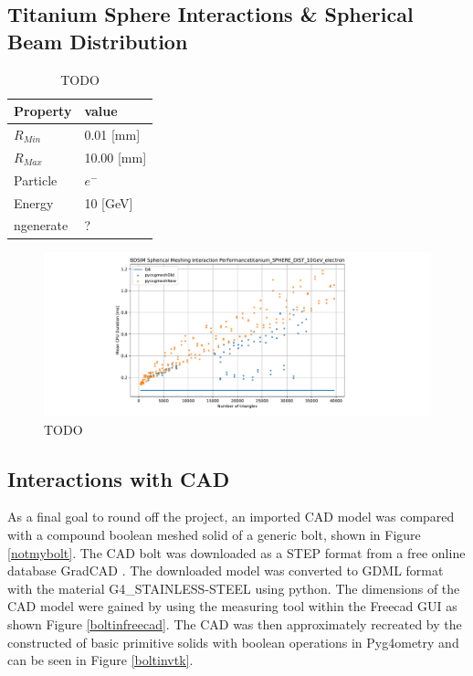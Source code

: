 \documentclass[12pt,a4paper]{article}
\begin{document}
\newpage
\subsection{Titanium Sphere Interactions \& Spherical Beam Distribution}

\begin{table}[h!]
\centering
\begin{tabular}{|l|l|}
\hline
Property & value \\ \hline
$R_{Min}$ &  0.01 [mm]\\ \hline
$R_{Max}$ &  10.00 [mm]\\ \hline
Particle &  $e^-$\\ \hline
Energy & 10 [GeV]\\ \hline
ngenerate & ?\\ \hline
\end{tabular}
\caption{TODO}
\label{rs}
\end{table}

\begin{figure}[h!]
\centering
\includegraphics[scale=0.5]{Images//BDSIM//numoftris_tit_10G_e_nostd.pdf}
\caption[width=\columnwidth]{TODO}
\label{tubspic}
\end{figure}

\subsection{Interactions with CAD}
As a final goal to round off the project, an imported CAD model was compared with a compound boolean meshed solid of a generic bolt, shown in Figure \ref{notmybolt}. The CAD bolt was downloaded as a STEP format from a free online database GradCAD \cite{cadmag}. The downloaded model was converted to GDML format with the material G4\_STAINLESS-STEEL using python. The dimensions of the CAD model were gained by using the measuring tool within the Freecad GUI as shown Figure \ref{boltinfreecad}. The CAD was then approximately recreated by the constructed of basic primitive solids with boolean operations in Pyg4ometry and can be seen in Figure \ref{boltinvtk}.
\end{document}
